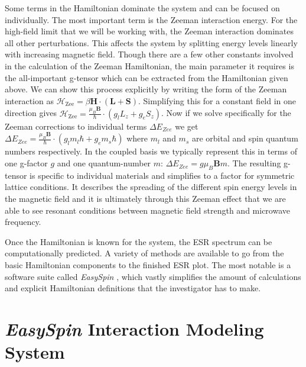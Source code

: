 \documentclass[oneside]{BYUPhys}
\begin{document}
Some terms in the Hamiltonian dominate the system and can be focused on individually. The most important term is the Zeeman interaction energy. For the high-field limit that we will be working with, the Zeeman interaction dominates all other perturbations. This affects the system by splitting energy levels linearly with increasing magnetic field. Though there are a few other constants involved in the calculation of the Zeeman Hamiltonian, the main parameter it requires is the all-important g-tensor which can be extracted from the Hamiltonian given above. We can show this process explicitly by writing the form of the Zeeman interaction as $\mathcal{H}_{\text{Zee}} = \beta \mathbf{H} \cdot (\mathbf{L}+\mathbf{S})$. Simplifying this for a constant field in one direction gives $\mathcal{H}_{\text{Zee}} = \frac{\mu_B\mathbf{B}}{\hbar}\cdot (g_l L_z+g_eS_z)$. Now if we solve specifically for the Zeeman corrections to individual terms $\Delta E_{Zee}$ we get $\Delta E_{Zee}=\frac{\mu_B\mathbf{B}}{\hbar}\cdot (g_lm_l\hbar+g_em_s\hbar)$ where $m_l$ and $m_s$ are orbital and spin quantum numbers respectively. In the coupled basis we typically represent this in terms of one g-factor $g$ and one quantum-number $m$: $\Delta E_{Zee}=g\mu_B\mathbf{B}m$. The resulting g-tensor is specific to individual materials and simplifies to a factor for symmetric lattice conditions. It describes the spreading of the different spin energy levels in the magnetic field and it is ultimately through this Zeeman effect that we are able to see resonant conditions between magnetic field strength and microwave frequency.

Once the Hamiltonian is known for the system, the ESR spectrum can be computationally predicted. A variety of methods are available to go from the basic Hamiltonian components to the finished ESR plot. The most notable is a software suite called \textit{EasySpin} \cite{RefWorks:doc:58929a02e4b0d4c09201f91b}, which vastly simplifies the amount of calculations and explicit Hamiltonian definitions that the investigator has to make.

\section{\textit{EasySpin} Interaction Modeling System}
\end{document}
